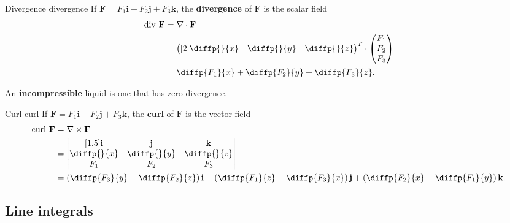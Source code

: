 \begin{definition}{Divergence \cite{math2111_notes}}{divergence} If $\mathbf{F} = F_1 \mathbf{i} + F_2 \mathbf{j} + F_3 \mathbf{k}$, the \textbf{divergence} of $\mathbf{F}$ is the scalar field
\begin{align*}
\text{div} \ \mathbf{F} &= \nabla \cdot \mathbf{F} \\
&= \begin{pmatrix}[2] \diffp{}{x} & \diffp{}{y} & \diffp{}{z} \end{pmatrix}^{T}
\cdot \begin{pmatrix} F_1 \\ F_2 \\ F_3 \end{pmatrix} \\
&= \diffp{F_1}{x} + \diffp{F_2}{y} + \diffp{F_3}{z} .
\end{align*}
\end{definition}

An \textbf{incompressible} liquid is one that has zero divergence.

\begin{definition}{Curl \cite{math2111_notes}}{curl}
If $\mathbf{F} = F_1 \mathbf{i} + F_2 \mathbf{j} + F_3 \mathbf{k}$, the \textbf{curl} of $\mathbf{F}$ is the vector field
\begin{align*}
\text{curl} \ \mathbf{F} &= \nabla \times \mathbf{F} \\
&= \begin{vmatrix}[1.5]
	\mathbf{i} & \mathbf{j} & \mathbf{k} \\
	\diffp{}{x} & \diffp{}{y} & \diffp{}{z} \\
	F_1 & F_2 & F_3
\end{vmatrix} \\
&= \left( \diffp{F_3}{y} - \diffp{F_2}{z} \right) \mathbf{i} + \left( \diffp{F_1}{z} - \diffp{F_3}{x} \right) \mathbf{j} + \left( \diffp{F_2}{x} - \diffp{F_1}{y} \right) \mathbf{k} .
\end{align*}
\end{definition}

\subsection{Line integrals}

